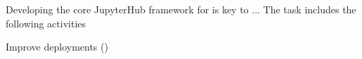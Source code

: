 \begin{task}[title=Developing core JupyterHub infrastructure,
  id=jupyterhub,
  lead=SRL,
  PM=2,
  wphases={0-48},
  partners={SRL,EuXFEL}
]
  Developing the core JupyterHub framework for is key to ...
  The task includes the following activities
  \begin{compactitem}
  \item Improve deployments
    ()
  \end{compactitem}
\end{task}
